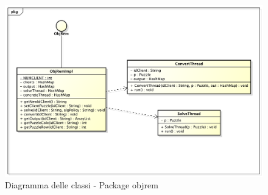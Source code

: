 		\begin{figure}[htbp]
			\centering
			\centerline{\includegraphics[scale=0.5]{img/objrem.pdf}}
			\caption{Diagramma delle classi - Package objrem}
			\label{fig_package_objrem}
		\end{figure}
		



